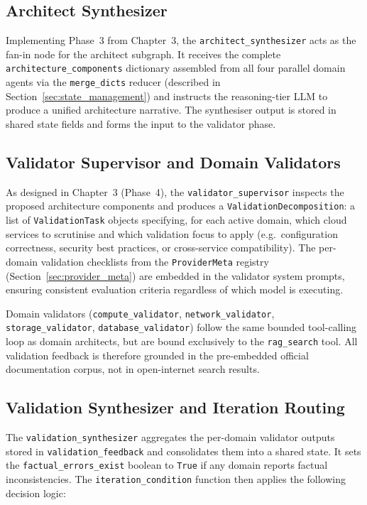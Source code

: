 \subsection{Architect Synthesizer}

Implementing Phase~3 from Chapter~3, the \texttt{architect\_synthesizer} acts as the fan-in node for the architect subgraph. It receives the complete \texttt{architecture\_components} dictionary assembled from all four parallel domain agents via the \texttt{merge\_dicts} reducer (described in Section~\ref{sec:state_management}) and instructs the reasoning-tier LLM to produce a unified architecture narrative. The synthesiser output is stored in shared state fields and forms the input to the validator phase.

\subsection{Validator Supervisor and Domain Validators}

As designed in Chapter~3 (Phase~4), the \texttt{validator\_supervisor} inspects the proposed architecture components and produces a \texttt{ValidationDecomposition}: a list of \texttt{ValidationTask} objects specifying, for each active domain, which cloud services to scrutinise and which validation focus to apply (e.g.\ configuration correctness, security best practices, or cross-service compatibility). The per-domain validation checklists from the \texttt{ProviderMeta} registry (Section~\ref{sec:provider_meta}) are embedded in the validator system prompts, ensuring consistent evaluation criteria regardless of which model is executing.

Domain validators (\texttt{compute\_validator}, \texttt{network\_validator}, \texttt{storage\_validator}, \texttt{database\_validator}) follow the same bounded tool-calling loop as domain architects, but are bound exclusively to the \texttt{rag\_search} tool. All validation feedback is therefore grounded in the pre-embedded official documentation corpus, not in open-internet search results.

\subsection{Validation Synthesizer and Iteration Routing}

The \texttt{validation\_synthesizer} aggregates the per-domain validator outputs stored in \texttt{validation\_feedback} and consolidates them into a shared state. It sets the \texttt{factual\_errors\_exist} boolean to \texttt{True} if any domain reports factual inconsistencies. The \texttt{iteration\_condition} function then applies the following decision logic:

